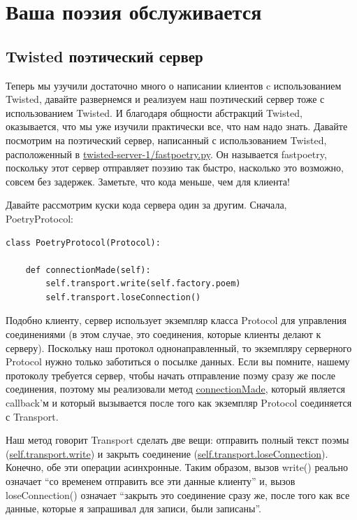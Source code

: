 

\section{Ваша поэзия обслуживается\label{sec:part11}}

\subsection{Twisted поэтический сервер}


Теперь мы узучили достаточно много о написании клиентов c 
использованием Twisted, давайте развернемся и реализуем наш 
поэтический сервер тоже с использованием Twisted. И благодаря 
общности абстракций Twisted, оказывается, что  
мы уже изучили практически все, что нам надо знать. Давайте 
посмотрим на поэтический сервер, написанный с использованием 
Twisted, расположенный в \href{http://github.com/jdavisp3/twisted-intro/blob/master/twisted-server-1/fastpoetry.py#L1}{twisted-server-1/fastpoetry.py}. Он называется fastpoetry, 
поскольку этот сервер отправляет поэзию так быстро, 
насколько это возможно, совсем без задержек. Заметьте, что 
кода меньше, чем для клиента!


Давайте рассмотрим куски кода сервера один за другим. Сначала, PoetryProtocol:

\begin{scriptsize}\begin{verbatim}
class PoetryProtocol(Protocol):

    def connectionMade(self):
        self.transport.write(self.factory.poem)
        self.transport.loseConnection()
\end{verbatim}\end{scriptsize}


Подобно клиенту, сервер использует экземпляр класса Protocol 
для управления соединениями (в этом случае, это соединения, 
которые клиенты делают к серверу). Поскольку наш протокол 
однонаправленный, то экземпляру серверного Protocol нужно 
только заботиться о посылке данных. Если вы помните, нашему  
протоколу требуется сервер, чтобы начать отправление поэму 
сразу же после соединения, поэтому мы реализовали метод 
\href{http://twistedmatrix.com/trac/browser/tags/releases/twisted-8.2.0/twisted/internet/protocol.py#L351}{connectionMade}, который является callback'м и который вызывается 
после того как экземпляр Protocol 
соединяется с Transport.  


Наш метод говорит Transport сделать две вещи: отправить полный текст поэмы (\href{http://twistedmatrix.com/trac/browser/tags/releases/twisted-8.2.0/twisted/internet/interfaces.py#L1302}{self.transport.write}) и закрыть соединение \newline (\href{http://twistedmatrix.com/trac/browser/tags/releases/twisted-8.2.0/twisted/internet/interfaces.py#L1321}{self.transport.loseConnection}). Конечно, обе 
эти операции асинхронные. Таким образом, вызов write() реально означает ``со временем отправить все 
эти данные клиенту'' и, вызов loseConnection() означает ``закрыть это соединение 
сразу же, после того как все данные, которые я запрашивал для 
записи, были записаны''. 


